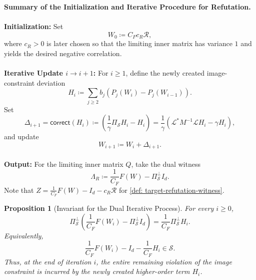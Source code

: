 \documentclass[12pt]{article}
\newtheorem{proposition}[theorem]{Proposition}
\newcommand{\calR}{\mathcal{R}}
\newcommand{\calS}{\mathcal{S}}
\newcommand{\corr}{\mathsf{correct}}
\newcommand{\calL}{\mathcal{L}}
\begin{document}
\begin{mdframed}[linewidth=0.2pt]
\textbf{Summary of the Initialization and Iterative Procedure for Refutation.}
\\\\
\textbf{Initialization:}
Set
\[
W_0\coloneqq C_Fc_R\calR,
\]
where \(c_R>0\) is later chosen so that the limiting inner matrix has
variance \(1\) and yields the desired negative correlation.
%
\\\\
\textbf{Iterative Update \(i\rightarrow i+1\):}
For \(i\ge 1\), define the newly created image-constraint deviation
\[
H_{i}
\coloneqq
\sum_{j\ge 2}b_j
\left(P_j(W_i)-P_j(W_{i-1})\right).
\]
Set
\[
\Delta_{i+1} = \corr(H_{i})
\coloneqq
\left(\frac{1}{\gamma} \Pi_{\calS}H_{i}  -   H_{i} \right) 
=
\frac{1}{\gamma} \left(\calL^*M^{-1}\calL H_{i}- \gamma  H_{i} \right),
\]
and update
\[
W_{i+1}\coloneqq W_i+\Delta_{i+1}.
\]
\\
\textbf{Output:}
For the limiting inner matrix \(Q\), take the dual witness
\[
\Lambda_R\coloneqq \frac{1}{C_F}F(W) - \Pi_{\calS}^\perp I_d.
\]
Note that $Z = \frac{1}{C_F}F(W) - I_d - c_R\calR$ for \cref{def: target-refutation-witness}.
\end{mdframed}

\begin{proposition}[Invariant for the Dual Iterative Process]
\label{prop:invariant-dual}
For every \(i\geq 0\),
\[
    \Pi_{\calS}^{\perp}
    \left(
        \frac{1}{C_F}F(W_i)-\Pi_{\calS}^{\perp}I_d
    \right)
    =
    \frac{1}{C_F}\Pi_{\calS}^{\perp}H_i.
\]
Equivalently,
\[
    \frac{1}{C_F}F(W_i)-I_d-\frac{1}{C_F}H_i
    \in \calS.
\]
Thus, at the end of iteration \(i\), the entire remaining violation of the
image constraint is incurred by the newly created higher-order term \(H_i\).
\end{proposition}
\end{document}
